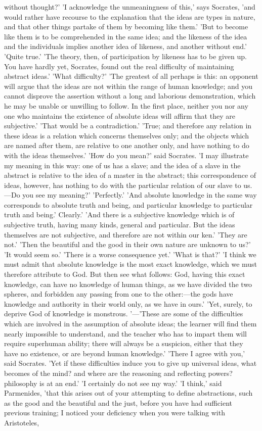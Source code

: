 \documentclass[11pt,letter]{article}
\begin{document}
without thought?' 'I acknowledge the unmeaningness of this,' says Socrates, 'and would rather have recourse to the explanation that the ideas are types in nature, and that other things partake of them by becoming like them.' 'But to become like them is to be comprehended in the same idea; and the likeness of the idea and the individuals implies another idea of likeness, and another without end.' 'Quite true.' 'The theory, then, of participation by likeness has to be given up. You have hardly yet, Socrates, found out the real difficulty of maintaining abstract ideas.' 'What difficulty?' 'The greatest of all perhaps is this: an opponent will argue that the ideas are not within the range of human knowledge; and you cannot disprove the assertion without a long and laborious demonstration, which he may be unable or unwilling to follow. In the first place, neither you nor any one who maintains the existence of absolute ideas will affirm that they are subjective.' 'That would be a contradiction.' 'True; and therefore any relation in these ideas is a relation which concerns themselves only; and the objects which are named after them, are relative to one another only, and have nothing to do with the ideas themselves.' 'How do you mean?' said Socrates. 'I may illustrate my meaning in this way: one of us has a slave; and the idea of a slave in the abstract is relative to the idea of a master in the abstract; this correspondence of ideas, however, has nothing to do with the particular relation of our slave to us.—Do you see my meaning?' 'Perfectly.' 'And absolute knowledge in the same way corresponds to absolute truth and being, and particular knowledge to particular truth and being.' Clearly.' 'And there is a subjective knowledge which is of subjective truth, having many kinds, general and particular. But the ideas themselves are not subjective, and therefore are not within our ken.' 'They are not.' 'Then the beautiful and the good in their own nature are unknown to us?' 'It would seem so.' 'There is a worse consequence yet.' 'What is that?' 'I think we must admit that absolute knowledge is the most exact knowledge, which we must therefore attribute to God. But then see what follows: God, having this exact knowledge, can have no knowledge of human things, as we have divided the two spheres, and forbidden any passing from one to the other:—the gods have knowledge and authority in their world only, as we have in ours.' 'Yet, surely, to deprive God of knowledge is monstrous. '—'These are some of the difficulties which are involved in the assumption of absolute ideas; the learner will find them nearly impossible to understand, and the teacher who has to impart them will require superhuman ability; there will always be a suspicion, either that they have no existence, or are beyond human knowledge.' 'There I agree with you,' said Socrates. 'Yet if these difficulties induce you to give up universal ideas, what becomes of the mind? and where are the reasoning and reflecting powers? philosophy is at an end.' 'I certainly do not see my way.' 'I think,' said Parmenides, 'that this arises out of your attempting to define abstractions, such as the good and the beautiful and the just, before you have had sufficient previous training; I noticed your deficiency when you were talking with Aristoteles, 
\end{document}
